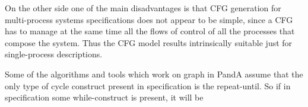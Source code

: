On the other side one of the main disadvantages is that C\+FG generation for multi-\/process systems specifications does not appear to be simple, since a C\+FG has to manage at the same time all the flows of control of all the processes that compose the system. Thus the C\+FG model results intrinsically suitable just for single-\/process descriptions.

Some of the algorithms and tools which work on graph in PandA assume that the only type of cycle construct present in specification is the repeat-\/until. So if in specification some while-\/construct is present, it will be 